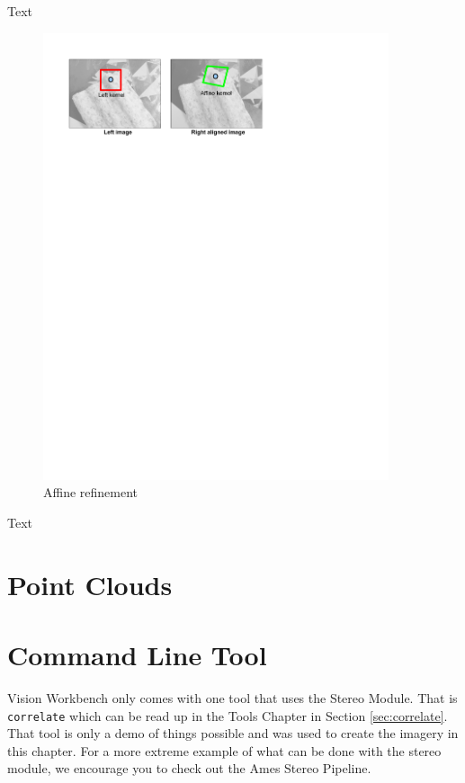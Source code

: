 Text

\begin{figure}[h]
\begin{center}
  \includegraphics[trim = 0in 9in 3in 0in, width=4in]{images/stereo/affine_window.pdf}
\end{center}
  \caption{Affine refinement}
  \label{fig:affine_refinement}
\end{figure}

Text



\section{Point Clouds}
\label{sec:command_line_tools}

\section{Command Line Tool}
\label{sec:command_line_tool}

Vision Workbench only comes with one tool that uses the Stereo
Module. That is \verb#correlate# which can be read up in the Tools
Chapter in Section \ref{sec:correlate}. That tool is only a demo of
things possible and was used to create the imagery in this chapter. For
a more extreme example of what can be done with the stereo module, we
encourage you to check out the Ames Stereo Pipeline.

\begin{thebibliography}{1}

\end{thebibliography}
